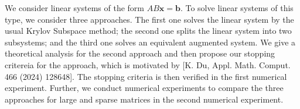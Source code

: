 We consider linear systems of the form $AB\boldsymbol{x}=\boldsymbol{b}$. To solve linear systems of this type, we consider three approaches. The first one solves the linear system by the usual Krylov Subspace method; the second one splits the linear system into two subsystems; and the third one solves an equivalent augmented system. We give a theoretical analysis for the second approach and then propose our stopping critereia for the approach, which is motivated by [K. Du, Appl. Math.
Comput. 466 (2024) 128648]. The stopping criteria is then verified in the first numerical experiment. Further, we conduct numerical experiments to compare the three approaches for large and sparse matrices in the second numerical experiment.